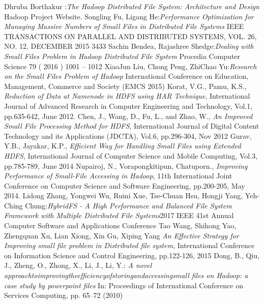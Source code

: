 \documentclass[UTF8]{ctexart}
\begin{document}
\begin{thebibliography}{99}
 Dhruba Borthakur :\emph{The Hadoop Distributed File System: Architecture and Design}  Hadoop Project Website.
Songling Fu, Ligang He:\emph{Performance Optimization for Managing Massive Numbers of Small Files in Distributed File Systems} IEEE TRANSACTIONS ON PARALLEL AND DISTRIBUTED SYSTEMS, VOL. 26, NO. 12, DECEMBER 2015 3433
Sachin Bendea, Rajashree Shedge:\emph{Dealing with Small Files Problem in Hadoop Distributed File System} Procedia Computer Science 79 ( 2016 ) 1001 – 1012
XiaoJun Liu, Chong Peng, ZhiChao Yu:\emph{Research on the Small Files Problem of Hadoop} International Conference on Education, Management, Commerce and Society (EMCS 2015)
Korat, V.G., Pamu, K.S., \emph{Reduction of Data at Namenode in HDFS using HAR Technique}, International Journal of Advanced Research in Computer Engineering and Technology, Vol.1, pp.635-642, June 2012.
Chen, J., Wang, D., Fu, L., and Zhao, W., \emph{An Improved Small File Processing Method for HDFS}, International Journal of Digital Content
Technology and its Applications (JDCTA), Vol.6, pp.296-304, Nov 2012
Gurav, Y.B., Jayakar, K.P., \emph{Efficient Way for Handling Small Files using Extended HDFS}, International Journal of Computer Science and
Mobile Computing, Vol.3, pp.785-789, June 2014
Nupairoj, N., Vorapongkitipun, Chatuporn., \emph{Improving Performance of Small-File Accessing in Hadoop}, 11th International Joint
Conference on Computer Science and Software Engineering, pp.200-205, May 2014.
Lidong Zhang, Yongwei Wu, Ruini Xue, Tse-Chuan Hsu, Hongji Yang, Yeh-Ching Chung:\emph{HybridFS - A High Performance and Balanced File System Framework with Multiple Distributed File Systems}2017 IEEE 41st Annual Computer Software and Applications Conference
Tao Wang, Shihong Yao, Zhengquan Xu, Lian Xiong, Xin Gu, Xiping Yang \emph{An Effective Strategy for Improving small file problem in Distributed file system}, International Conference on Information Science and Control Engineering, pp.122-126, 2015
Dong, B., Qiu, J., Zheng, O., Zhong, X., Li, J., Li, Y.: \emph{A novel approachtoimprovingtheefﬁciencyofstoringandaccessingsmall ﬁles on Hadoop: a case study by powerpoint ﬁles} In: Proceedings of International Conference on Services Computing, pp. 65–72 (2010) 
\end{thebibliography}
\end{document}
